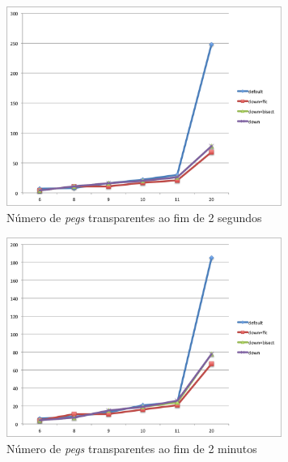 \documentclass{llncs}
\begin{document}
\begin{figure}[ht]
\centering
\includegraphics[width=90mm]{grafico2.png}
\caption{N\'{u}mero de \emph{pegs} transparentes ao fim de 2 segundos}
\label{graf2}
\end{figure}


\begin{figure}[ht]
\centering
\includegraphics[width=90mm]{grafico1.png}
\caption{N\'{u}mero de \emph{pegs} transparentes ao fim de 2 minutos}
\label{graf3}
\end{figure}
\end{document}
